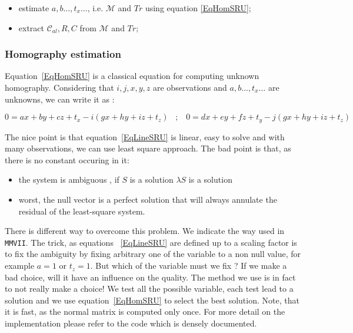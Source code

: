 \begin{itemize}
     \item estimate $a,b\dots ,t_x \dots$, i.e. $\mathcal{M}$ and $Tr$ using equation \ref{EqHomSRU};
     \item extract  $\mathcal{C}_{al},R,C$ from $\mathcal{M}$ and $Tr$;
\end{itemize}


\subsubsection{Homography estimation}

Equation~\ref{EqHomSRU} is a classical equation for computing unknown homography.
Considering that $i,j,x,y,z$ are observations and $a,b\dots ,t_x \dots$ are unknowns, we can write it 
as :

\begin{equation}
	0 = {ax+by+cz+t_x} -i (gx+hy+iz+t_z)
   \;\;\; ; \;\;\;
	0 = dx+ey+fz+t_y - j (gx+hy+iz+t_z)
	\label{EqLineSRU}
\end{equation}

The nice point is that equation~\ref{EqLineSRU} is linear, easy to solve and with
many observations, we can use least square approach. The bad point is that,
as there is no constant occuring in it: 

\begin{itemize}
    \item the system is ambiguous , if $S$ is a solution $\lambda S$ is a solution
    \item worst, the null vector is a perfect solution that will always annulate the residual
	    of the least-square system.
\end{itemize}

There is different way to overcome this problem. We indicate the way used in {\tt MMVII}.
The trick, as equations ~\ref{EqLineSRU} are defined up to a scaling factor is to fix the
ambiguity by fixing arbitrary one of the variable to a non null value, for example $a=1$ or $t_z=1$. 
But which of the variable must we fix ?  If we make a bad choice, will it have an influence on the
quality.  The method we use is in fact to not really make a choice! We test all the
possible variable, each test lead to a solution and we use equation~\ref{EqHomSRU} to
select the best solution. Note, that it is fast, as the normal matrix is computed only once.
For more detail on the implementation please refer to the code which is densely
documented.


